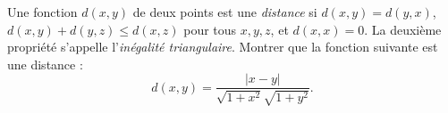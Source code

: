 Une fonction $d(x, y)$ de deux points est une \emph{distance} si $d(x, y) = d(y, x)$, $d(x, y) + d(y, z) \leq d(x, z)$ pour tous $x, y, z$, et $d(x, x) = 0$. La deuxième propriété s'appelle l'\emph{inégalité triangulaire}. Montrer que la fonction suivante est une distance :
\[ d(x, y) = \frac{|x - y|}{\sqrt{1 + x^2}\sqrt{1 + y^2}}. \]

